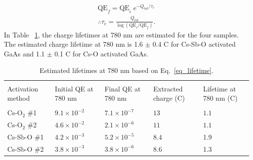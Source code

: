 \begin{equation}
	\label{eq_lifetime}
	\begin{aligned}
		\text{QE}_{f} = \text{QE}_{i} \; e^{-Q_{tot}/\tau_{c}} \\
		\therefore \tau_{c} = \frac{Q_{tot}} {\log(\text{QE}_i/\text{QE}_f)}.
	\end{aligned}
\end{equation}
In Table ~\ref{table_lifetime}, the charge lifetimes at 780 nm are estimated for the four samples.
The estimated charge lifetime at 780 nm is 1.6 $\pm$ 0.4 C for Cs-Sb-O activated GaAs and 1.1 $\pm$ 0.1 C for Cs-O activated GaAs.

\setlength{\tabcolsep}{4pt}	
\begin{table}
	\centering
	
	\begin{tabular}{l|llll}
		\hline \hline \\
		\multirow{2}{5em}{Activation method} & \multirow{2}{5em}{Initial QE at 780 nm}            & \multirow{2}{5em}{Final QE at 780 nm}               & %
		\multirow{2}{5em}{Extracted charge (C)} & \multirow{2}{5em}{Lifetime at 780 nm (C)} \\
		 \\
		\hline
		\\Cs-O$_2$ \#1 &  $9.1 \times 10^{-2}$  &  $ 7.1 \times 10^{-7}$ & $13$  &$1.1$       \\
		Cs-O$_2$ \#2 & $4.6 \times 10^{-2}$ & $2.1 \times 10^{-6}$	& $11$ &$ 1.1 $\\
		Cs-Sb-O \#1  & $4.2 \times 10^{-3}$     & $5.2 \times 10^{-5}$  &   $8.4$     & 1.9     \\
	
		Cs-Sb-O \#2	& $3.8 \times 10^{-3}$	& $3.8 \times 10^{-6}$	& $8.6 $ & 1.3	\\

		\hline \hline                                                                             
	\end{tabular}
	\caption{Estimated lifetimes at 780 nm based on Eq.~\ref{eq_lifetime}.}
	\label{table_lifetime}
\end{table}

